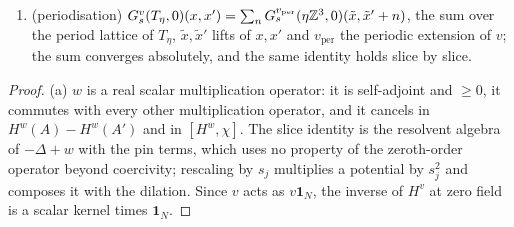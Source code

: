 \begin{lemma}
\begin{enumerate}[label=\textup{(\alph*)},nosep,leftmargin=*]
\item\textup{(periodisation)} $G^v_s(T_\eta,0)(x,x')=\sum_{n}G^{v_{\mathrm{per}}}_s(\eta\mathbb Z^3,0)(\tilde x,\tilde x'+n)$, the sum over the period lattice of $T_\eta$, $\tilde x,\tilde x'$ lifts of $x,x'$ and $v_{\mathrm{per}}$ the periodic extension of $v$; the sum converges absolutely, and the same identity holds slice by slice.
\end{enumerate}
\end{lemma}

\begin{proof}
(a) $w$ is a real scalar multiplication operator: it is self-adjoint and $\ge0$, it commutes with every other multiplication operator, and it cancels in $H^w(A)-H^w(A')$ and in $[H^w,\chi]$. The slice identity is the resolvent algebra of $-\Delta+w$ with the pin terms, which uses no property of the zeroth-order operator beyond coercivity; rescaling by $s_j$ multiplies a potential by $s_j^2$ and composes it with the dilation. Since $v$ acts as $v\mathbf 1_N$, the inverse of $H^v$ at zero field is a scalar kernel times $\mathbf 1_N$.


\end{proof}
